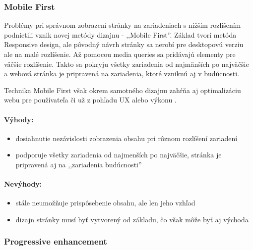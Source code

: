 

\subsubsection{Mobile First} %
\label{ssub:mobile_first_responsive_design}

Problémy pri správnom zobrazení stránky na zariadeniach s nižším rozlíšením podnietili vznik novej metódy dizajnu - ,,Mobile First''. Základ tvorí metóda Responsive design, ale pôvodný návrh stránky sa nerobí pre desktopovú verziu ale na malé rozlíšenie. Až pomocou media queries sa pridávajú elementy pre väčšie rozlíšenie. Takto sa pokryju všetky zariadenia od najmänších po najväčšie a webová stránka je pripravená na zariadenia, ktoré vzniknú aj v budúcnosti.

Technika Mobile First však okrem samotného dizajnu zahŕňa aj optimalizáciu webu pre používateľa či už z pohľadu UX alebo výkonu \cite{mobilefirst}.

\paragraph{Výhody:}
\begin{itemize}
	\item dosiahnutie nezávislosti zobrazenia obsahu pri rôznom rozlíšení zariadení
	\item podporuje všetky zariadenia od najmenších po najväčšie, stránka je pripravená aj na ,,zariadenia budúcnosti''
\end{itemize}

\paragraph{Nevýhody:}
\begin{itemize}
	\item stále neumožňuje prispôsebenie obsahu, ale len jeho vzhľad
	\item dizajn stránky musí byť vytvorený od základu, čo však môže byť aj východa
\end{itemize}


\subsubsection{Progressive enhancement} %
\label{ssub:progressive_enhancement}

